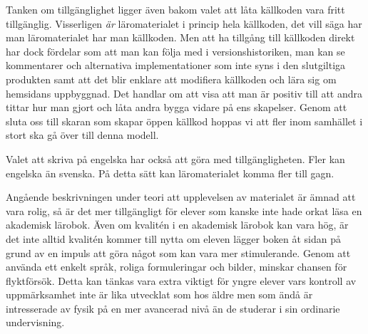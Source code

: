 Tanken om tillgänglighet ligger även bakom valet att låta källkoden vara fritt
tillgänglig. Visserligen \textit{är} läromaterialet i princip hela källkoden, det vill säga
har man läromaterialet har man källkoden. Men att ha tillgång till källkoden
direkt har dock fördelar som att man kan följa med i versionshistoriken, man kan
se kommentarer och alternativa implementationer som inte syns i den slutgiltiga
produkten samt att det blir enklare att modifiera källkoden och lära sig om
hemsidans uppbyggnad.  Det handlar om att visa att man är positiv till att andra
tittar hur man gjort och låta andra bygga vidare på ens skapelser. Genom att
sluta oss till skaran som skapar öppen källkod hoppas vi att fler inom samhället
i stort ska gå över till denna modell. 

Valet att skriva på engelska har också att göra med tillgängligheten. Fler kan
engelska än svenska. På detta sätt kan läromaterialet komma fler till gagn.

Angående beskrivningen under teori att upplevelsen av materialet är ämnad att
vara rolig, så är det mer tillgängligt för elever som kanske inte hade orkat
läsa en akademisk lärobok. Även om kvalitén i en akademisk lärobok kan vara hög,
är det inte alltid kvalitén kommer till nytta om eleven lägger boken åt sidan på
grund av en impuls att göra något som kan vara mer stimulerande.  Genom att
använda ett enkelt språk, roliga formuleringar och bilder, minskar chansen för
flyktförsök. Detta kan tänkas vara extra viktigt för yngre elever vars kontroll
av uppmärksamhet inte är lika utvecklat som hos äldre men som ändå är
intresserade av fysik på en mer avancerad nivå än de studerar i sin ordinarie
undervisning.

